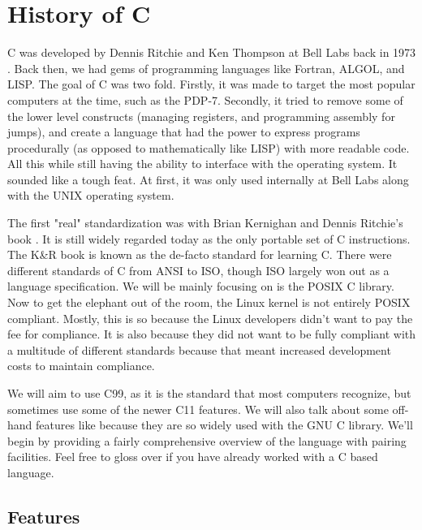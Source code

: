 \section{History of C}

C was developed by Dennis Ritchie and Ken Thompson at Bell Labs back in 1973 \cite{Ritchie:1993:DCL:155360.155580}.
Back then, we had gems of programming languages like Fortran, ALGOL, and LISP.
The goal of C was two fold.
Firstly, it was made to target the most popular computers at the time, such as the PDP-7.
Secondly, it tried to remove some of the lower level constructs (managing registers, and programming assembly for jumps), and create a language that had the power to express programs procedurally (as opposed to mathematically like LISP) with more readable code.
All this while still having the ability to interface with the operating system.
It sounded like a tough feat.
At first, it was only used internally at Bell Labs along with the UNIX operating system.

The first "real" standardization was with Brian Kernighan and Dennis Ritchie's book \cite{kernighan1988c}.
It is still widely regarded today as the only \gls{portable} set of C instructions.
The K\&R book is known as the de-facto standard for learning C.
There were different standards of C from ANSI to ISO, though ISO largely won out as a language specification.
We will be mainly focusing on is the \gls{POSIX} C library.
Now to get the elephant out of the room, the Linux kernel is not entirely POSIX compliant.
Mostly, this is so because the Linux developers didn't want to pay the fee for compliance.
It is also because they did not want to be fully compliant with a multitude of different standards because that meant increased development costs to maintain compliance.

We will aim to use C99, as it is the standard that most computers recognize, but sometimes use some of the newer C11 features.
We will also talk about some off-hand features like  because they are so widely used with the GNU C library.
We'll begin by providing a fairly comprehensive overview of the language with pairing facilities.
Feel free to gloss over if you have already worked with a C based language.


\subsection{Features}

